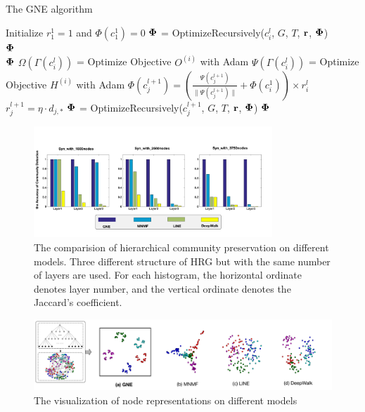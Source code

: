 \documentclass{article}
\theoremstyle{definition}
\begin{document}
\begin{algorithm}[h] 
\caption{The GNE algorithm} 
	\label{alg:gne} 
\begin{algorithmic}
	\State Initialize $r_1^1 = 1$ and $\Phi(c^1_1) = 0$
	\State $\bf{\Phi}$ = OptimizeRecursively($c_i^l$, $G$, $T$, $\bf{r}$, $\bf{\Phi}$) \\
	\Return $\bf{\Phi}$ 
\EndFunction
	\\\hrulefill
{} 
		\Return $\bf{\Phi}$		
	\EndIf
	\State $\Omega(\Gamma(c_i^{l}))$ = Optimize Objective $O^{(i)}$ with Adam
	\State $\Psi(\Gamma(c_i^{l}))$ = Optimize Objective $H^{(i)}$ with Adam
		\State $\Phi(c_j^{l+1}) = \left(\frac{\Psi(c_j^{l+1})}{\lVert \Psi(c_j^{l+1}) \rVert}  + \Phi(c_i^{1})\right) \times r_i^{l}$
		\State $r_j^{l+1} = \eta \cdot d_{j,*}$
	\EndFor
		\State $\bf{\Phi}$ = OptimizeRecursively($c_j^{l+1}$, $G$, $T$, $\bf{r}$, $\bf{\Phi}$) 
	\EndFor
	\Return $\bf{\Phi}$
\EndFunction
\end{algorithmic} 
\end{algorithm}


\begin{figure}[htb]
		\center
		\includegraphics[width=0.8\textwidth]{figure/community_preservation.pdf}
		\caption{The comparision of hierarchical community preservation on different models. Three different structure of HRG but with the same number of layers are used. For each histogram, the horizontal ordinate denotes layer number, and the vertical ordinate denotes the Jaccard's coefficient.}
		\label{fig:community_preservation}
	\end{figure}

	\begin{figure}[htb]
		\center
		\includegraphics[width=1.0\textwidth]{figure/visualization.pdf}
		\caption{The visualization of node representations on different models}
		\label{fig:visualization}
	\end{figure}
\end{document}
